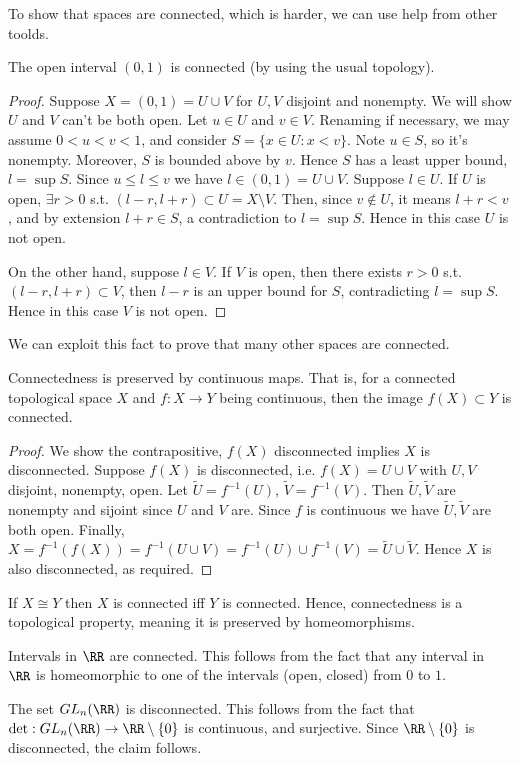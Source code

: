 To show that spaces are connected, which is harder, we can use help from other
toolds.
\begin{theorem}
  The open interval $(0,1)$ is connected (by using the usual topology).
  \label{<+label+>}
\end{theorem}
\begin{proof}
  Suppose $X=(0,1)=U\cup V$ for $U,V$ disjoint and nonempty. We will show $U$
  and $V$ can't be both open. Let $u\in U$ and $v\in V$. Renaming if necessary,
  we may assume $0<u<v<1$, and consider $S=\{x\in U: x< v\}$. Note $u\in S$, so
  it's nonempty. Moreover, $S$ is bounded above by $v$. Hence $S$ has a least
  upper bound, $l=\sup S$. Since $u\leq l \leq v$ we have $l\in (0,1)=U\cup V$.
  Suppose $l\in U$. If $U$ is open, $\exists r>0$ s.t. $(l-r,l+r)\subset
  U=X\setminus V$. Then, since $v\not\in U$, it means $l+r<v$, and by extension
  $l+r\in S$, a contradiction to $l=\sup S$. Hence in this case $U$ is not open. 

  On the other hand, suppose $l\in V$. If $V$ is open, then there exists $r>0$
  s.t. $(l-r,l+r)\subset V$, then $l-r$ is an upper bound for $S$, contradicting
  $l=\sup S$. Hence in this case $V$ is not open.
\end{proof}

We can exploit this fact to prove that many other spaces are connected.

\begin{proposition}
  Connectedness is preserved by continuous maps. That is, for a connected
  topological space $X$ and $f:X\to Y$ being continuous, then the image
  $f(X)\subset Y$ is connected.
  \label{<+label+>}
\end{proposition}
\begin{proof}
  We show the contrapositive, $f(X)$ disconnected implies $X$ is disconnected.
  Suppose $f(X)$ is disconnected, i.e. $f(X)=U\cup V$ with $U,V$ disjoint,
  nonempty, open. Let $\tilde{U}=f^{-1}(U)$, $\tilde{V}=f^{-1}(V)$. Then
  $\tilde{U},\tilde{V}$ are nonempty and sijoint since $U$ and $V$ are. Since
  $f$ is continuous we have $\tilde{U},\tilde{V}$ are both open. 
  Finally, $X=f^{-1}(f(X))=f^{-1}(U\cup V)=f^{-1}(U)\cup
  f^{-1}(V)=\tilde{U}\cup\tilde{V}$. Hence $X$ is also disconnected, as
  required.
\end{proof}

\begin{corollary}
  If $X\cong Y$ then $X$ is connected iff $Y$ is connected. Hence, connectedness
  is a topological property, meaning it is preserved by homeomorphisms.
\end{corollary}
\begin{corollary}
  Intervals in $\RR$ are connected. This follows from the fact that any interval
  in $\RR$ is homeomorphic to one of the intervals (open, closed) from $0$ to
  $1$.
\end{corollary}
\begin{corollary}
  The set $GL_n(\RR)$ is disconnected. This follows from the fact that
  $\det:GL_n(\RR)\to \RR\setminus\{0\}$  is continuous, and surjective. Since
  $\RR\setminus\{0\}$ is disconnected, the claim follows.
  \label{<+label+>}
\end{corollary}
